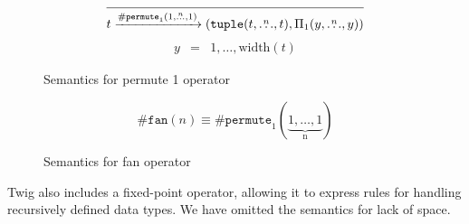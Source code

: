 \begin{figure}[htb]
\[
\infer
  {t \arr{\mathtt{\#permute}_1(1,\overset{n}{\ldots},1)} (\mathtt{tuple}(t,\overset{n}{\ldots},t),\Pi_1(y,\overset{n}{\ldots},y))}
  {}
\]
\begin{eqnarray*}
y &=& 1,\ldots,\mbox{width}(t)
\end{eqnarray*}
\caption{Semantics for permute 1 operator}
\label{fig:permute-one}
\end{figure}


\begin{figure}[ht]
\[
\mathtt{\#fan}(n) \equiv \mathtt{\#permute}_1(\underbrace{1,\ldots,1}_\text{n})
\]
\caption{Semantics for fan operator}
\label{fig:fan}
\end{figure}

Twig also includes a fixed-point operator, allowing it to express rules for handling recursively defined data types. We have omitted the semantics for lack of space.
